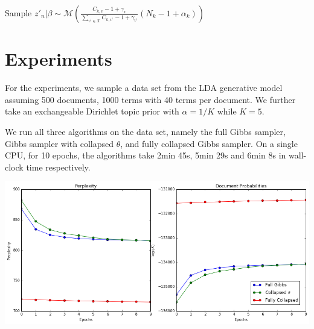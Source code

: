\documentclass[a0,portrait]{a0poster}
\begin{document}
\begin{multicols}{2}
\begin{minipage}{\linewidth}
	\label{alg:collapsed}
	\begin{algorithmic}[1]
		\State Sample $z'_n | \beta \sim \mathcal{M}(\frac{C_{k,v}  -1 + \gamma_{v}}{\sum_{ v^{\prime} \in \mathcal{X}}C_{k,v^{\prime}} - 1 + \gamma_{v^{\prime}}} (N_k - 1 + \alpha_k))$ 
		\EndFor
		\EndFor
		\EndFor
		\EndFunction
	\end{algorithmic}
\end{minipage}

\section{Experiments}

For the experiments, we sample a data set from the LDA generative model assuming 500 documents, 1000 terms with 40 terms per document. We further take an exchangeable Dirichlet topic prior with $\alpha = 1/K$ while $K = 5$. 

We run all three algorithms on the data set, namely the full Gibbs sampler, Gibbs sampler with collapsed $\theta$, and fully collapsed Gibbs sampler. On a single CPU, for 10 epochs, the algorithms take 2min 45s, 5min 29s and 6min 8s in wall-clock time respectively.

\vspace{2cm}
\begin{minipage}{\linewidth}
	\centering
	\label{fig:results}
	\includegraphics{results}
\end{minipage}






\end{multicols}
\end{document}
